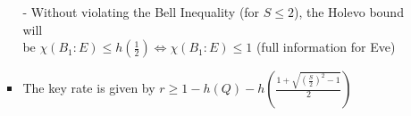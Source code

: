\documentclass{beamer}
\begin{document}
\begin{frame}
\begin{itemize}
\begin{itemize}
\begin{itemize}
                    - Without violating the Bell Inequality (for $S \leq 2$), the Holevo bound will\\\hspace{0.5em}be $\chi({B}_{1}:E) \leq h\left(\frac{1}{2}\right) \Leftrightarrow \chi({B}_{1}:E) \leq 1$ (full information for Eve)\\
                    \vspace{1ex}
                    \small
                    \item The key rate is given by $r \geq 1 - h(Q) - h\left( \frac{1 + \sqrt{{(\frac{S}{2})}^{2} - 1}}{2} \right)$
                \end{itemize}
            \end{itemize}
        \end{itemize}
    \end{frame}
\end{document}
